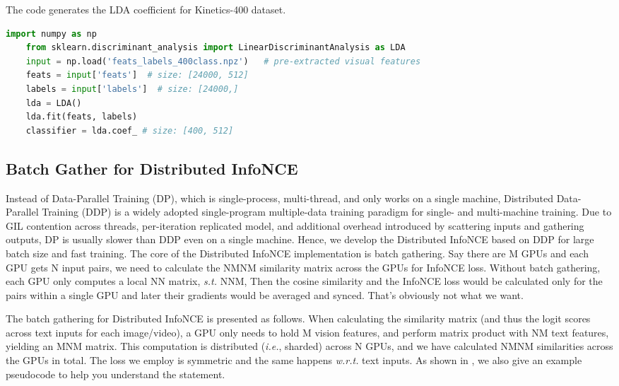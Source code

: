 \documentclass[letterpaper]{article} \usepackage{aaai23}  \usepackage{times}  \usepackage{helvet}  \usepackage{courier}  \usepackage[hyphens]{url}  \usepackage{graphicx} \urlstyle{rm} \def\UrlFont{\rm}  \usepackage{natbib}  \usepackage{caption} \frenchspacing  \setlength{\pdfpagewidth}{8.5in}  \setlength{\pdfpageheight}{11in}  \usepackage{algorithm}
\begin{document}
\begin{algorithm*}[h]
	\caption{The code generates the LDA coefficient for Kinetics-400 dataset.}
	\label{lda}
	\begin{lstlisting}[language=python]
    import numpy as np
    from sklearn.discriminant_analysis import LinearDiscriminantAnalysis as LDA
    input = np.load('feats_labels_400class.npz')   # pre-extracted visual features
    feats = input['feats']  # size: [24000, 512]
    labels = input['labels']  # size: [24000,]
    lda = LDA()
    lda.fit(feats, labels)
    classifier = lda.coef_ # size: [400, 512]	
	\end{lstlisting}
\end{algorithm*}


\subsection{Batch Gather for Distributed InfoNCE}\label{sec:batch_gather}
\label{sm:batch_gather}
Instead of Data-Parallel Training (DP), which is single-process, multi-thread, and only works on a single machine, Distributed Data-Parallel Training (DDP) is a widely adopted single-program multiple-data training paradigm for single- and multi-machine training.
Due to GIL contention across threads, per-iteration replicated model, and additional overhead introduced by scattering inputs and gathering outputs, DP is usually slower than DDP even on a single machine.
Hence, we develop the Distributed InfoNCE based on DDP for large batch size and fast training.
The core of the Distributed InfoNCE implementation is batch gathering.
Say there are M GPUs and each GPU gets N input pairs, we need to calculate the NM\x NM similarity matrix across the GPUs for InfoNCE loss. 
Without batch gathering, each GPU only computes a local N\x N matrix, \emph{s.t.} NNM, Then the cosine similarity and the InfoNCE loss would be calculated only for the pairs within a single GPU and later their gradients would be averaged and synced. 
That's obviously not what we want.

The batch gathering for Distributed InfoNCE is presented as follows.
When calculating the similarity matrix (and thus the logit scores across text inputs for each image/video), a GPU only needs to hold M vision features, and perform matrix product with NM text features, yielding an M\x NM matrix. This computation is distributed (\emph{i.e.}, sharded) across N GPUs, and we have calculated NM\x NM similarities across the GPUs in total. The loss we employ is symmetric and the same happens \emph{w.r.t.} text inputs.
As shown in , we also give an example pseudocode to help you understand the statement. 
\end{document}
